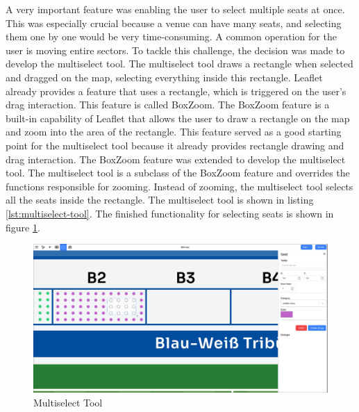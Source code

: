A very important feature was enabling the user to select multiple seats at once. This was especially crucial because a venue can have many seats, and selecting them one by one would be very time-consuming. A common operation for the user is moving entire sectors. To tackle this challenge, the decision was made to develop the multiselect tool. The multiselect tool draws a rectangle when selected and dragged on the map, selecting everything inside this rectangle. Leaflet already provides a feature that uses a rectangle, which is triggered on the user's drag interaction. This feature is called BoxZoom. The BoxZoom feature is a built-in capability of Leaflet that allows the user to draw a rectangle on the map and zoom into the area of the rectangle. This feature served as a good starting point for the multiselect tool because it already provides rectangle drawing and drag interaction. The BoxZoom feature was extended to develop the multiselect tool. The multiselect tool is a subclass of the BoxZoom feature and overrides the functions responsible for zooming. Instead of zooming, the multiselect tool selects all the seats inside the rectangle. The multiselect tool is shown in listing \ref{lst:multiselect-tool}. The finished functionality for selecting seats is shown in figure \ref{fig:multiselect-tool}.
\begin{figure}
    \centering
    \includegraphics[scale=0.22]{pics/multiselect.png}
    \caption{Multiselect Tool}
    \label{fig:multiselect-tool}
\end{figure}

